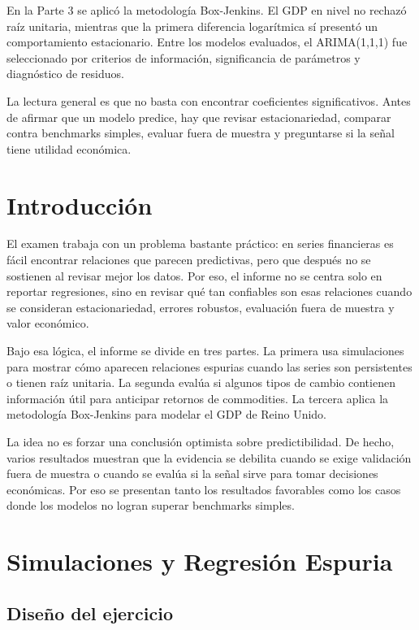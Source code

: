 \documentclass[11pt,letterpaper]{article}
\begin{document}
En la Parte 3 se aplicó la metodología Box-Jenkins. El GDP en nivel no rechazó raíz unitaria, mientras que la primera diferencia logarítmica sí presentó un comportamiento estacionario. Entre los modelos evaluados, el ARIMA(1,1,1) fue seleccionado por criterios de información, significancia de parámetros y diagnóstico de residuos.

La lectura general es que no basta con encontrar coeficientes significativos. Antes de afirmar que un modelo predice, hay que revisar estacionariedad, comparar contra benchmarks simples, evaluar fuera de muestra y preguntarse si la señal tiene utilidad económica.

\newpage

\section{Introducción}

El examen trabaja con un problema bastante práctico: en series financieras es fácil encontrar relaciones que parecen predictivas, pero que después no se sostienen al revisar mejor los datos. Por eso, el informe no se centra solo en reportar regresiones, sino en revisar qué tan confiables son esas relaciones cuando se consideran estacionariedad, errores robustos, evaluación fuera de muestra y valor económico.

Bajo esa lógica, el informe se divide en tres partes. La primera usa simulaciones para mostrar cómo aparecen relaciones espurias cuando las series son persistentes o tienen raíz unitaria. La segunda evalúa si algunos tipos de cambio contienen información útil para anticipar retornos de commodities. La tercera aplica la metodología Box-Jenkins para modelar el GDP de Reino Unido.

La idea no es forzar una conclusión optimista sobre predictibilidad. De hecho, varios resultados muestran que la evidencia se debilita cuando se exige validación fuera de muestra o cuando se evalúa si la señal sirve para tomar decisiones económicas. Por eso se presentan tanto los resultados favorables como los casos donde los modelos no logran superar benchmarks simples.

\newpage
\section{Simulaciones y Regresión Espuria}

\subsection{Diseño del ejercicio}
\end{document}
